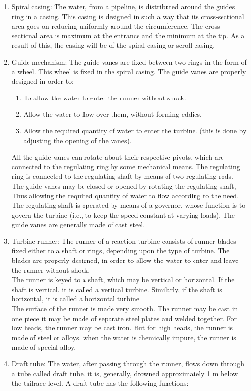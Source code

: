 \documentclass[11pt]{article}
\begin{document}
\begin{enumerate}
	\item Spiral casing: The water, from a pipeline, is distributed around the guides ring in a casing. This casing is designed in such a way that its cross-sectional area goes on reducing uniformly around the circumference. 
	The cross-sectional area is maximum at the entrance and the minimum at the tip. As a result of this, the casing will be of the spiral casing or scroll casing.
	\item Guide mechanism: The guide vanes are fixed between two rings in the form of a wheel. This wheel is fixed in the spiral casing. The guide vanes are properly designed in order to:
		\begin{enumerate}
			\item To allow the water to enter the runner without shock.
			\item Allow the water to flow over them, without forming eddies.
			\item Allow the required quantity of water to enter the turbine. (this is done by adjusting the opening of the vanes).
		\end{enumerate}

	All the guide vanes can rotate about their respective pivots, which are connected to the regulating ring by some mechanical means. The regulating ring is connected to the regulating shaft by means of two regulating rods.\\	
	The guide vanes may be closed or opened by rotating the regulating shaft, Thus allowing the required quantity of water to flow according to the need. The regulating shaft is operated by means of a governor, whose function is to govern the turbine (i.e., to keep the speed constant at varying loads). The guide vanes are generally made of cast steel.
	\item Turbine runner: The runner of a reaction turbine consists of runner blades fixed either to a shaft or rings, depending upon the type of turbine. The blades are properly designed, in order to allow the water to enter and leave the runner without	shock.\\
	The runner is keyed to a shaft, which may be vertical or horizontal. If the shaft
	is vertical, it is called a vertical turbine. Similarly, if the shaft is horizontal, it is called a horizontal turbine\\
	The surface of the runner is made very smooth. The runner may be cast in one piece it may be made of separate steel plates and welded together. For low heads, the runner may be cast iron. But for high heads, the runner is made of steel or alloys. when the water is chemically impure, the runner is made of special alloy.
	
	\item Draft tube: The water, after passing through the runner, flows down through a tube called draft tube. it is, generally, drowned approximately 1 m below the tailrace level. A draft tube has the following functions: 
\end{enumerate}
\end{document}
